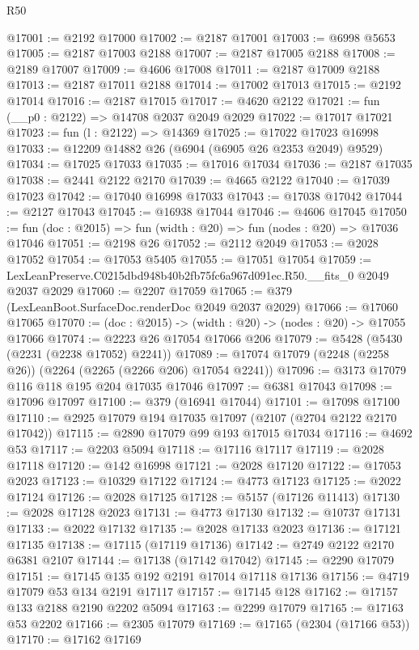\begin{lexlean}{R50}
\begin{coremodule}
@17001 := @2192 @17000
@17002 := @2187 @17001
@17003 := @6998 @5653
@17005 := @2187 @17003 @2188
@17007 := @2187 @17005 @2188
@17008 := @2189 @17007
@17009 := @4606 @17008
@17011 := @2187 @17009 @2188
@17013 := @2187 @17011 @2188
@17014 := @17002 @17013
@17015 := @2192 @17014
@17016 := @2187 @17015
@17017 := @4620 @2122
@17021 := fun (__p0 : @2122) => @14708 @2037 @2049 @2029
@17022 := @17017 @17021
@17023 := fun (l : @2122) => @14369
@17025 := @17022 @17023 @16998
@17033 := @12209 @14882 @26 (@6904 (@6905 @26 @2353 @2049) @9529)
@17034 := @17025 @17033
@17035 := @17016 @17034
@17036 := @2187 @17035
@17038 := @2441 @2122 @2170
@17039 := @4665 @2122
@17040 := @17039 @17023
@17042 := @17040 @16998 @17033
@17043 := @17038 @17042
@17044 := @2127 @17043
@17045 := @16938 @17044
@17046 := @4606 @17045
@17050 := fun (doc : @2015) => fun (width : @20) => fun (nodes : @20) => @17036 @17046
@17051 := @2198 @26
@17052 := @2112 @2049
@17053 := @2028 @17052
@17054 := @17053 @5405
@17055 := @17051 @17054
@17059 := LexLeanPreserve.C0215dbd948b40b2fb75fc6a967d091ec.R50.__fits_0 @2049 @2037 @2029
@17060 := @2207 @17059
@17065 := @379 (LexLeanBoot.SurfaceDoc.renderDoc @2049 @2037 @2029)
@17066 := @17060 @17065
@17070 := (doc : @2015) -> (width : @20) -> (nodes : @20) -> @17055 @17066
@17074 := @2223 @26 @17054 @17066 @206
@17079 := @5428 (@5430 (@2231 (@2238 @17052) @2241))
@17089 := @17074 @17079 (@2248 (@2258 @26)) (@2264 (@2265 (@2266 @206) @17054 @2241))
@17096 := @3173 @17079 @116 @118 @195 @204 @17035 @17046
@17097 := @6381 @17043
@17098 := @17096 @17097
@17100 := @379 (@16941 @17044)
@17101 := @17098 @17100
@17110 := @2925 @17079 @194 @17035 @17097 (@2107 (@2704 @2122 @2170 @17042))
@17115 := @2890 @17079 @99 @193 @17015 @17034
@17116 := @4692 @53
@17117 := @2203 @5094
@17118 := @17116 @17117
@17119 := @2028 @17118
@17120 := @142 @16998
@17121 := @2028 @17120
@17122 := @17053 @2023
@17123 := @10329 @17122
@17124 := @4773 @17123
@17125 := @2022 @17124
@17126 := @2028 @17125
@17128 := @5157 (@17126 @11413)
@17130 := @2028 @17128 @2023
@17131 := @4773 @17130
@17132 := @10737 @17131
@17133 := @2022 @17132
@17135 := @2028 @17133 @2023
@17136 := @17121 @17135
@17138 := @17115 (@17119 @17136)
@17142 := @2749 @2122 @2170 @6381 @2107
@17144 := @17138 (@17142 @17042)
@17145 := @2290 @17079
@17151 := @17145 @135 @192 @2191 @17014 @17118 @17136
@17156 := @4719 @17079 @53 @134 @2191 @17117
@17157 := @17145 @128
@17162 := @17157 @133 @2188 @2190 @2202 @5094
@17163 := @2299 @17079
@17165 := @17163 @53 @2202
@17166 := @2305 @17079
@17169 := @17165 (@2304 (@17166 @53))
@17170 := @17162 @17169

\end{coremodule}
\end{lexlean}
